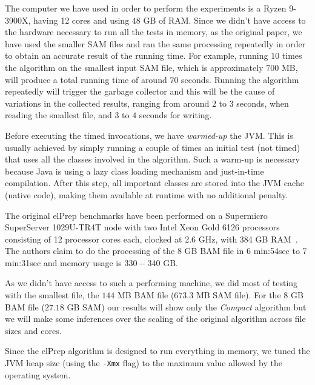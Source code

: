 \documentclass[a4paper,twoside]{article}
\begin{document}
The computer we have used in order to perform the experiments is a Ryzen 9-3900X, having 12 cores and using 48 GB of RAM\@.
Since we didn't have access to the hardware necessary to run all the tests in memory, as the original paper, we have used the smaller SAM files and ran the same processing repeatedly in order to obtain an accurate result of the running time.
For example, running $10$ times the algorithm on the smallest input SAM file, which is approximately $700$ MB, will produce a total running time of around $70$ seconds. 
Running the algorithm repeatedly will trigger the garbage collector and this will be the cause of variations in the collected results, ranging from around $2$ to $3$ seconds, when reading the smallest file, and $3$ to $4$ seconds for writing.

Before executing the timed invocations, we have {\textit{warmed-up} } the JVM\@.
This is usually achieved by simply running a couple of times an initial test (not timed) that uses all the classes involved in the algorithm.
Such a warm-up is necessary because Java is using a lazy class loading mechanism and just-in-time compilation.
After this step, all important classes are stored into the JVM cache (native code), making them available at runtime with no additional penalty.

The original elPrep benchmarks have been performed on a Supermicro SuperServer 1029U-TR4T node with two
Intel Xeon Gold 6126 processors consisting of 12 processor cores each, clocked at 2.6 GHz, with 384 GB RAM~\cite{costanza:2019}.
The authors claim to do the processing of the 8 GB BAM file in 6 min:54sec to 7 min:31sec and memory usage is $330-340$ GB\@.

As we didn't have access to such a performing machine, we did most of testing with the smallest file, the $144$ MB BAM file ($673.3$ MB SAM file). For the $8$ GB BAM file ($27.18$ GB SAM) our results will show only the {\it Compact} algorithm but we will make some inferences over the scaling of the original algorithm across file sizes and cores.

Since the elPrep algorithm is designed to run everything in memory, we tuned the JVM heap size (using the \texttt{-Xmx} flag) to the maximum value allowed by the operating system. 
\end{document}

